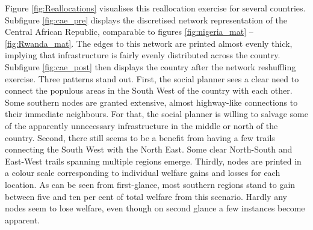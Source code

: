 \documentclass[11pt, oneside]{article}   	%
\begin{document}
Figure \eqref{fig:Reallocations} visualises this reallocation exercise for several countries. Subfigure \eqref{fig:cae_pre} displays the discretised network representation of the Central African Republic, comparable to figures \eqref{fig:nigeria_mat} -- \eqref{fig:Rwanda_mat}. The edges to this network are printed almost evenly thick, implying that infrastructure is fairly evenly distributed across the country. Subfigure \eqref{fig:cae_post} then displays the country after the network reshuffling exercise. Three patterns stand out. First, the social planner sees a clear need to connect the populous areas in the South West of the country with each other. Some southern nodes are granted extensive, almost highway-like connections to their immediate neighbours. For that, the social planner is willing to salvage some of the apparently unnecessary infrastructure in the middle or north of the country. Second, there still seems to be a benefit from having a few trails connecting the South West with the North East. Some clear North-South and East-West trails spanning multiple regions emerge. Thirdly, nodes are printed in a colour scale corresponding to individual welfare gains and losses for each location. As can be seen from first-glance, most southern regions stand to gain between five and ten per cent of total welfare from this scenario. Hardly any nodes seem to lose welfare, even though on second glance a few instances become apparent.
\end{document}
